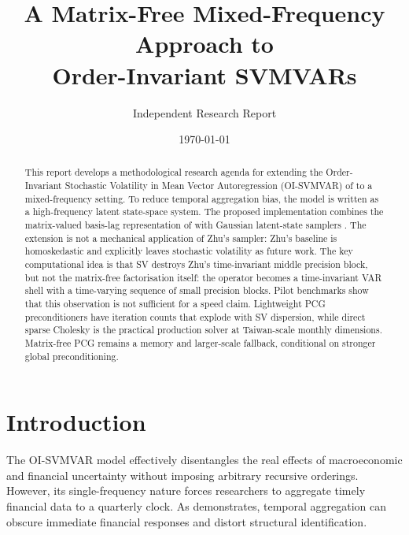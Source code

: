 \documentclass[12pt]{article}
\title{A Matrix-Free Mixed-Frequency Approach to \\ Order-Invariant SVMVARs}
\author{Independent Research Report}
\date{\today}
\begin{document}
\maketitle

\begin{abstract}
This report develops a methodological research agenda for extending the Order-Invariant Stochastic Volatility in Mean Vector Autoregression (OI-SVMVAR) of \citet{davidson2025investigating} to a mixed-frequency setting. To reduce temporal aggregation bias, the model is written as a high-frequency latent state-space system. The proposed implementation combines the matrix-valued basis-lag representation of \citet{zhu2026structural} with Gaussian latent-state samplers \citep{papandreou2010gaussian,bardsley2012mcmc}. The extension is not a mechanical application of Zhu's sampler: Zhu's baseline is homoskedastic and explicitly leaves stochastic volatility as future work. The key computational idea is that SV destroys Zhu's time-invariant middle precision block, but not the matrix-free factorisation itself: the operator becomes a time-invariant VAR shell with a time-varying sequence of small precision blocks. Pilot benchmarks show that this observation is not sufficient for a speed claim. Lightweight PCG preconditioners have iteration counts that explode with SV dispersion, while direct sparse Cholesky is the practical production solver at Taiwan-scale monthly dimensions. Matrix-free PCG remains a memory and larger-scale fallback, conditional on stronger global preconditioning.
\end{abstract}

\section{Introduction}
The \citet{davidson2025investigating} OI-SVMVAR model effectively disentangles the real effects of macroeconomic and financial uncertainty without imposing arbitrary recursive orderings. However, its single-frequency nature forces researchers to aggregate timely financial data to a quarterly clock. As \citet{zhu2026structural} demonstrates, temporal aggregation can obscure immediate financial responses and distort structural identification. 
\end{document}
